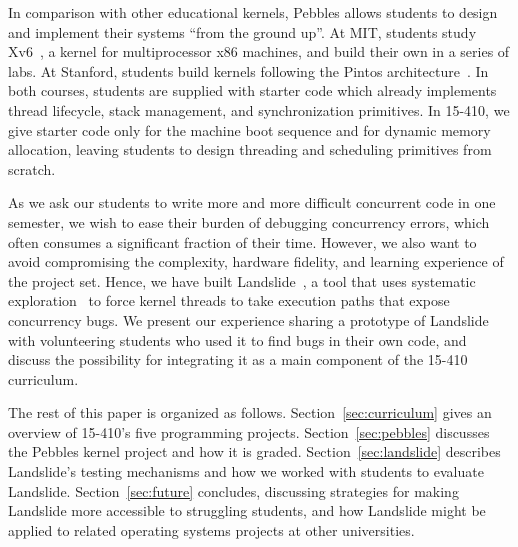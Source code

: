 In comparison with other educational kernels,
Pebbles allows students to design and implement their systems ``from the ground up''.
At MIT, students study Xv6~\cite{xv6}, a kernel for multiprocessor x86 machines,
and build their own in a series of labs.
At Stanford, students build kernels following the Pintos architecture~\cite{pintos}.
In both courses, students are supplied with starter code which already implements thread lifecycle, stack management, and synchronization primitives.
In 15-410, we give starter code only for the machine boot sequence and for dynamic memory allocation, leaving students to design threading and scheduling primitives from scratch.

As we ask our students to write more and more difficult concurrent code in one semester, we wish to ease their burden of debugging concurrency errors, which often consumes a significant fraction of their time.
However, we also want to avoid compromising the complexity, hardware fidelity, and learning experience of the project set.
Hence, we have built Landslide~\cite{landslide}, a tool that uses systematic exploration~\cite{verisoft} to force kernel threads to take execution paths that expose concurrency bugs.
We present our experience sharing a prototype of Landslide with volunteering students who used it to find bugs in their own code, and discuss the possibility for integrating it as a main component of the 15-410 curriculum.


The rest of this paper is organized as follows.
Section~\ref{sec:curriculum} gives an overview of 15-410's five programming projects.
Section~\ref{sec:pebbles} discusses the Pebbles kernel project and how it is graded.
Section~\ref{sec:landslide} describes Landslide's testing mechanisms and how we worked with students to evaluate Landslide.
Section~\ref{sec:future} concludes, discussing strategies for making Landslide more accessible to struggling students, and how Landslide might be applied to related operating systems projects at other universities.
